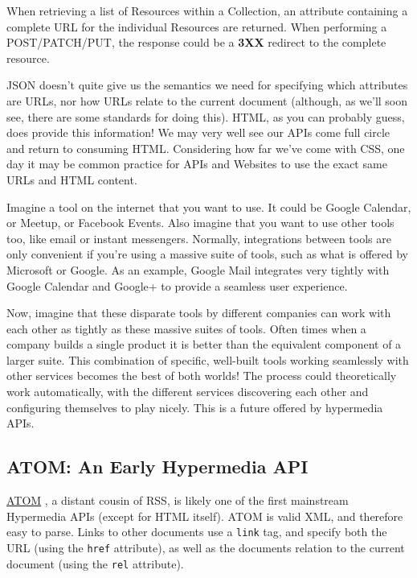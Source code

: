 \documentclass{book}
\begin{document}
When retrieving a list of Resources within a Collection, an attribute containing a complete URL for the individual Resources are returned. When performing a POST/PATCH/PUT, the response could be a \textbf{3XX} redirect to the complete resource.

JSON doesn't quite give us the semantics we need for specifying which attributes are URLs, nor how URLs relate to the current document (although, as we'll soon see, there are some standards for doing this). HTML, as you can probably guess, does provide this information! We may very well see our APIs come full circle and return to consuming HTML. Considering how far we've come with CSS, one day it may be common practice for APIs and Websites to use the exact same URLs and HTML content.

Imagine a tool on the internet that you want to use. It could be Google Calendar, or Meetup, or Facebook Events. Also imagine that you want to use other tools too, like email or instant messengers. Normally, integrations between tools are only convenient if you're using a massive suite of tools, such as what is offered by Microsoft or Google. As an example, Google Mail integrates very tightly with Google Calendar and Google+ to provide a seamless user experience.

Now, imagine that these disparate tools by different companies can work with each other as tightly as these massive suites of tools. Often times when a company builds a single product it is better than the equivalent component of a larger suite. This combination of specific, well-built tools working seamlessly with other services becomes the best of both worlds! The process could theoretically work automatically, with the different services discovering each other and configuring themselves to play nicely. This is a future offered by hypermedia APIs.

\subsection{ATOM: An Early Hypermedia API}

\href{https://en.wikipedia.org/wiki/Atom\_\%28standard\%29}{ATOM} \cite{HYPERATOM}, a distant cousin of RSS, is likely one of the first mainstream Hypermedia APIs (except for HTML itself). ATOM is valid XML, and therefore easy to parse. Links to other documents use a \texttt{link} tag, and specify both the URL (using the \texttt{href} attribute), as well as the documents relation to the current document (using the \texttt{rel} attribute).
\end{document}
